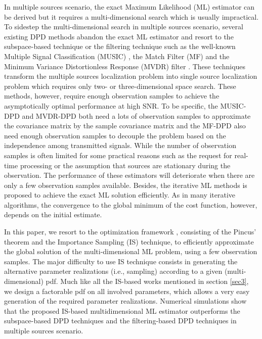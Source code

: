 \documentclass[review]{elsarticle}
\begin{document}
In multiple sources scenario, the exact Maximum Likelihood (ML) estimator can be derived but it requires a multi-dimensional search which is usually impractical. To sidestep the multi-dimensional search in multiple sources scenario, several existing DPD methods abandon the exact ML estimator and resort to the subspace-based technique or the filtering technique such as the well-known Multiple Signal Classification (MUSIC) \cite{DPD2005}, the Match Filter (MF) \cite{2004Direct} and the Minimum Variance Distortionless Response (MVDR) filter \cite{Tirer2015High}. These techniques transform the multiple sources localization problem into single source localization problem which requires only two- or three-dimensional space search. 
These methods, however, require enough observation samples to achieve the asymptotically optimal performance at high SNR. To be specific, the MUSIC-DPD \cite{DPD2005} and MVDR-DPD \cite{Tirer2015High} both need a lots of observation samples to approximate the covariance matrix by the sample covariance matrix and the MF-DPD \cite{2004Direct} also need enough observation samples to decouple the problem based on the independence among transmitted signals. While the number of observation samples is often limited for some practical reasons such as the request for real-time processing or the assumption that sources are stationary during the observation. The performance of these estimators will deteriorate when there are only a few observation samples available. Besides, the iterative ML methods \cite{2006Efficient} is proposed to achieve the exact ML solution efficiently. As in many iterative algorithms, the convergence to the global minimum of the cost function, however, depends on the initial estimate.

In this paper, we resort to the optimization framework \cite{Kay2000Mean}, consisting of the Pincus' theorem \cite{Pincus1968A} and the Importance Sampling (IS) technique, to efficiently approximate the global solution of the multi-dimensional ML problem, using a few observation samples. The major difficulty to use IS technique consists in generating the alternative parameter realizations (i.e., sampling) according to a given (multi-dimensional) pdf. Much like all the IS-based works mentioned in section \ref{sec3}, we design a factorable pdf on all involved parameters, which allows a very easy generation of the required parameter realizations. Numerical simulations show that the proposed IS-based multidimensional ML estimator outperforms the subspace-based DPD techniques and the filtering-based DPD techniques in multiple sources scenario.
\end{document}
